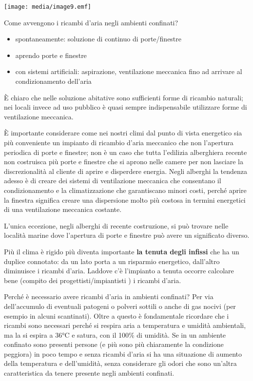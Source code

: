 \documentclass[]{article}
\begin{document}
\texttt{[image: media/image9.emf]}

Come avvengono i ricambi d'aria negli ambienti confinati?

\begin{itemize}
\item
  spontaneamente: soluzione di continuo di porte/finestre
\item
  aprendo porte e finestre
\item
  con sistemi artificiali: aspirazione, ventilazione meccanica fino ad
  arrivare al condizionamento dell'aria
\end{itemize}

È chiaro che nelle soluzione abitative sono sufficienti forme di
ricambio naturali; nei locali invece ad uso pubblico è quasi sempre
indispensabile utilizzare forme di ventilazione meccanica.

È importante considerare come nei nostri climi dal punto di vista
energetico sia più conveniente un impianto di ricambio d'aria meccanico
che non l'apertura periodica di porte e finestre; non è un caso che
tutta l'edilizia alberghiera recente non costruisca più porte e finestre
che si aprono nelle camere per non lasciare la discrezionalità al
cliente di aprire e disperdere energia. Negli alberghi la tendenza
adesso è di creare dei sistemi di ventilazione meccanica che consentano
il condizionamento e la climatizzazione che garantiscano minori costi,
perché aprire la finestra significa creare una dispersione molto più
costosa in termini energetici di una ventilazione meccanica costante.

L'unica eccezione, negli alberghi di recente costruzione, si può trovare
nelle località marine dove l'apertura di porte e finestre può avere un
significato diverso.

Più il clima è rigido più diventa importante \textbf{la tenuta degli
infissi} che ha un duplice connotato: da un lato porta a un risparmio
energetico, dall'altro diminuisce i ricambi d'aria. Laddove c'è
l'impianto a tenuta occorre calcolare bene (compito dei
progettisti/impiantisti ) i ricambi d'aria.

Perché è necessario avere ricambi d'aria in ambienti confinati? Per via
dell'accumulo di eventuali patogeni o polveri sottili o anche di gas
nocivi (per esempio in alcuni scantinati). Oltre a questo è fondamentale
ricordare che i ricambi sono necessari perché si respira aria a
temperatura e umidità ambientali, ma la si espira a 36°C e satura, con
il 100\% di umidità. Se in un ambiente confinato sono presenti persone
(e più sono più chiaramente la condizione peggiora) in poco tempo e
senza ricambi d'aria si ha una situazione di aumento della temperatura e
dell'umidità, senza considerare gli odori che sono un'altra
caratteristica da tenere presente negli ambienti confinati.
\end{document}
